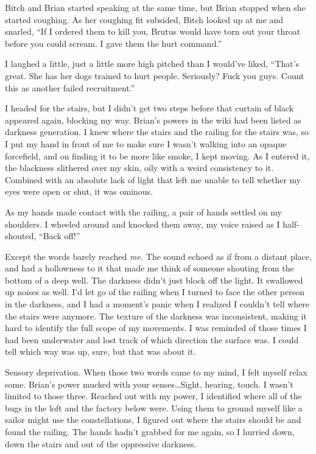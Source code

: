 Bitch and Brian started speaking at the same time, but Brian stopped when she started coughing.  As her coughing fit subsided, Bitch looked up at me and snarled, ``If I ordered them to kill you, Brutus would have torn out your throat before you could scream.  I gave them the hurt command.''



I laughed a little, just a little more high pitched than I would've liked, ``That's great.  She has her dogs trained to hurt people.  Seriously?  Fuck you guys.  Count this as another failed recruitment.''



I headed for the stairs, but I didn't get two steps before that curtain of black appeared again, blocking my way.  Brian's powers in the wiki had been listed as darkness generation.  I knew where the stairs and the railing for the stairs was, so I put my hand in front of me to make sure I wasn't walking into an opaque forcefield, and on finding it to be more like smoke, I kept moving.  As I entered it, the blackness slithered over my skin, oily with a weird consistency to it.  Combined with an absolute lack of light that left me unable to tell whether my eyes were open or shut, it was ominous.



As my hands made contact with the railing, a pair of hands settled on my shoulders.  I wheeled around and knocked them away, my voice raised as I half-shouted, ``Back off!''



Except the words barely reached \emph{me.}  The sound echoed as if from a distant place, and had a hollowness to it that made me think of someone shouting from the bottom of a deep well.  The darkness didn't just block off the light.  It swallowed up noises as well.    I'd let go of the railing when I turned to face the other person in the darkness, and I had a moment's panic when I realized I couldn't tell where the stairs were anymore.  The texture of the darkness was inconsistent, making it hard to identify the full scope of my movements.  I was reminded of those times I had been underwater and lost track of which direction the surface was.  I could tell which way was up, sure, but that was about it.



Sensory deprivation.  When those two words came to my mind, I felt myself relax some.  Brian's power mucked with your senses\ldots Sight, hearing, touch.  I wasn't limited to those three.  Reached out with my power, I identified where all of the bugs in the loft and the factory below were.  Using them to ground myself like a sailor might use the constellations, I figured out where the stairs should be and found the railing.  The hands hadn't grabbed for me again, so I hurried down, down the stairs and out of the oppressive darkness.



